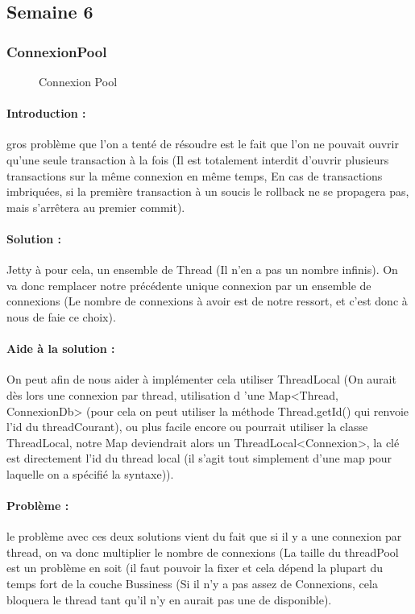 \documentclass{article}[12pt]
\begin{document}
\subsection{Semaine 6}
\subsubsection{ConnexionPool}
\begin{figure}[H]
    \centering
    \caption{Connexion Pool}
\end{figure}
\paragraph{Introduction : } gros problème que l'on a tenté de résoudre est le fait que l'on ne pouvait ouvrir qu'une seule transaction à la fois (Il est totalement interdit d'ouvrir plusieurs transactions sur la même connexion en même temps, En cas de transactions imbriquées, si la première transaction à un soucis le rollback ne se propagera pas, mais s'arrêtera au premier commit). 
\paragraph{Solution : } Jetty à pour cela, un ensemble de Thread (Il n'en a pas un nombre infinis). On va donc remplacer notre précédente unique connexion par un ensemble de connexions (Le nombre de connexions à avoir est de notre ressort, et c'est donc à nous de faie ce choix).
\paragraph{Aide à la solution : } On peut afin de nous aider à implémenter cela utiliser ThreadLocal (On aurait dès lors une connexion par thread, utilisation d 'une Map<Thread, ConnexionDb> (pour cela on peut utiliser la méthode Thread.getId() qui renvoie l'id du threadCourant), ou plus facile encore ou pourrait utiliser la classe ThreadLocal, notre Map deviendrait alors un ThreadLocal<Connexion>, la clé est directement l'id du thread local (il s'agit tout simplement d'une map pour laquelle on a spécifié la syntaxe)). 
\paragraph{Problème : } le problème avec ces deux solutions vient du fait que si il y a une connexion par thread, on va donc multiplier le nombre de connexions (La taille du threadPool est un problème en soit (il faut pouvoir la fixer et cela dépend la plupart du temps fort de la couche Bussiness (Si il n'y a pas assez de Connexions, cela bloquera le thread tant qu'il n'y en aurait pas une de disponible). 
\end{document}

